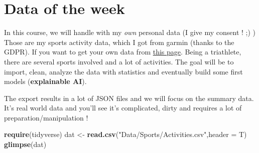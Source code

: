 \documentclass[
]{book}
\newenvironment{Shaded}{\begin{snugshade}}{\end{snugshade}}
\newcommand{\DataTypeTok}[1]{\textcolor[rgb]{0.13,0.29,0.53}{#1}}
\newcommand{\KeywordTok}[1]{\textcolor[rgb]{0.13,0.29,0.53}{\textbf{#1}}}
\newcommand{\NormalTok}[1]{#1}
\newcommand{\StringTok}[1]{\textcolor[rgb]{0.31,0.60,0.02}{#1}}
\begin{document}
\hypertarget{data-of-the-week}{%
\section{Data of the week}\label{data-of-the-week}}

In this course, we will handle with my \emph{own} personal data (I give my consent ! ;) )
Those are my sports activity data, which I got from garmin (thanks to the GDPR). If you want to get your own data from \href{https://www.garmin.com/en-US/account/datamanagement/exportdata/}{this page}.
Being a triathlete, there are several sports involved and a lot of activities. The goal will be to import, clean, analyze the data with statistics and eventually build some first models (\textbf{explainable AI}).

The export results in a lot of JSON files and we will focus on the summary data. It's real world data and you'll see it's complicated, dirty and requires a lot of preparation/manipulation !

\begin{Shaded}
\begin{Highlighting}[]
\KeywordTok{require}\NormalTok{(tidyverse)}
\NormalTok{dat <-}\StringTok{ }\KeywordTok{read.csv}\NormalTok{(}\StringTok{"Data/Sports/Activities.csv"}\NormalTok{,}\DataTypeTok{header =}\NormalTok{ T)}
\KeywordTok{glimpse}\NormalTok{(dat)}
\end{Highlighting}
\end{Shaded}
\end{document}
